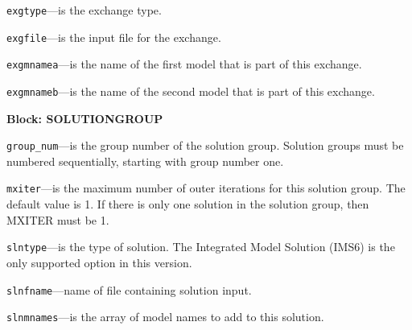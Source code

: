 \begin{description}
\item \texttt{exgtype}---is the exchange type.

\item \texttt{exgfile}---is the input file for the exchange.

\item \texttt{exgmnamea}---is the name of the first model that is part of this exchange.

\item \texttt{exgmnameb}---is the name of the second model that is part of this exchange.

\end{description}
\item \textbf{Block: SOLUTIONGROUP}

\begin{description}
\item \texttt{group\_num}---is the group number of the solution group.  Solution groups must be numbered sequentially, starting with group number one.

\item \texttt{mxiter}---is the maximum number of outer iterations for this solution group.  The default value is 1.  If there is only one solution in the solution group, then MXITER must be 1.

\item \texttt{slntype}---is the type of solution.  The Integrated Model Solution (IMS6) is the only supported option in this version.

\item \texttt{slnfname}---name of file containing solution input.

\item \texttt{slnmnames}---is the array of model names to add to this solution.

\end{description}

